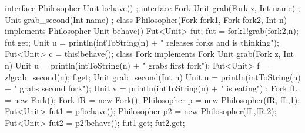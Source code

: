 interface Philosopher {
    Unit behave() ;
}
interface Fork {
    Unit grab(Fork z, Int name) ;
    Unit grab_second(Int name) ;
}
class Philosopher(Fork fork1, Fork fork2, Int n) implements Philosopher {
    Unit behave() {
        Fut<Unit> fut;
        fut = fork1!grab(fork2,n);
        fut.get;
        Unit u = println(intToString(n) + " releases forks and is thinking");
        Fut<Unit> c = this!behave();
    }
}
class Fork implements Fork {
    Unit grab(Fork z, Int n) {
        Unit u = println(intToString(n) + " grabs first fork");
        Fut<Unit> f = z!grab_second(n);
        f.get;
    }
    Unit grab_second(Int n) {
        Unit u = println(intToString(n) + " grabs second fork");
        Unit v = println(intToString(n) + " is eating") ;
    }
}
{
    Fork fL = new Fork();
    Fork fR = new Fork();
    Philosopher p = new Philosopher(fR, fL,1);
    Fut<Unit> fut1 = p!behave();
    Philosopher p2 = new Philosopher(fL,fR,2);
    Fut<Unit> fut2 = p2!behave();
    fut1.get;
    fut2.get;
}